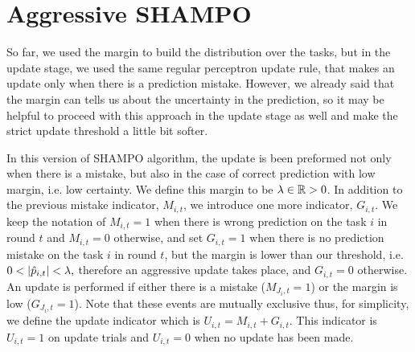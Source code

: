 {\section{Aggressive SHAMPO}

So far, we used the margin to build the distribution over the tasks, but in the update stage,
we used the same regular perceptron update rule, that makes an update only when there is a prediction 
mistake. However, we already said that the margin can tells us about the uncertainty in the prediction, 
so it may be helpful to proceed with this approach in the update stage as well and make the strict update 
threshold a little bit softer. 

In this  version of SHAMPO algorithm, the update is been preformed not only when there is a mistake, 
but also in the case of correct prediction with low margin, i.e. low certainty. We define this margin to be
$\lambda \in\mathbb{R}>0$. In addition to the previous mistake indicator, $M_{i,t}$,  we introduce one more 
indicator,  $G_{i,t}$. We keep the notation of  $M_{i,t}=1$ when there is wrong prediction on the task $i$
in round $t$ and $M_{i,t}=0$ otherwise, and set $G_{i,t}=1$ when there is no prediction mistake on the task 
$i$ in round $t$, but the margin is lower than our threshold, i.e. $0<\left\vert{\hat{p}_{i,t}}\right\vert<\lambda,$ therefore an
aggressive update takes place, and $G_{i,t}=0$  otherwise. 
An update is performed if either there is a mistake ($M_{J_i,t}=1$) or the margin is
low ($G_{J_i,t}=1$). Note that these events are mutually exclusive thus, for simplicity, we define the update
indicator which is  $U_{i,t}=M_{i,t}+G_{i,t}$. This indicator is  $U_{i,t}=1$ on update trials and  $U_{i,t}=0$
when no update has been made.

}
